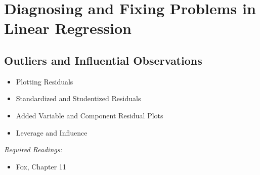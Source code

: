 \documentclass{article}
\begin{document}






\section{Diagnosing and Fixing Problems in Linear Regression}
\subsection{Outliers and Influential Observations}
	\begin{itemize}
	\item Plotting Residuals
	\item Standardized and Studentized Residuals
	\item Added Variable and Component Residual Plots
	\item Leverage and Influence
\end{itemize}
\textit{Required Readings:} 
	\begin{itemize}
  \item Fox, Chapter 11 
\end{itemize}
	
\end{document}
